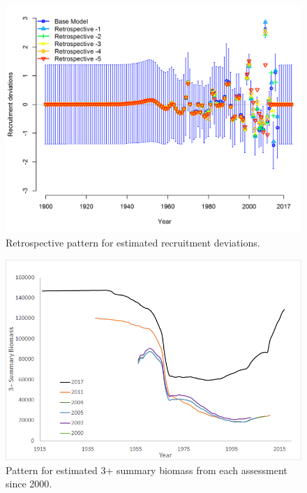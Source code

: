 \documentclass[12pt,]{article}
\begin{document}
\FloatBarrier

\begin{figure}
\centering
\includegraphics{Figures/compare10_recdevs_uncertainty.png}
\caption{Retrospective pattern for estimated recruitment deviations.
\label{fig:retro_recdev}}
\end{figure}

\FloatBarrier

\begin{figure}
\centering
\includegraphics{Figures/historical_analysis.png}
\caption{Pattern for estimated 3+ summary biomass from each assessment
since 2000. \label{fig:historical_analysis}}
\end{figure}

\FloatBarrier
\end{document}
